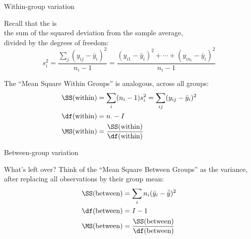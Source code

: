 \begin{frame}{Within-group variation}

  Recall that the  is \\
  the sum of the squared deviation from the sample average,\\
  divided by the degrees of freedom:
  \[
  s_i^2 = \frac{ \sum_j (y_{ij}-\bar y_i)^2 }{ n_i-1 } = \frac{ (y_{i1} - \bar y_i)^2 + \cdots + (y_{in_i} - \bar y_i)^2 }{n_i-1}
  \]

    \vspace{2em}

    The ``\alert{Mean Square Within Groups}'' is analogous, across all groups:
    \begin{align*}
      \SS(\text{within}) &= \sum_{i} (n_i-1) s_i^2 = \sum_{ij} (y_{ij}-\bar y_i)^2 \\
      \df(\text{within}) &= n_\cdot - I \\
      \MS(\text{within}) &= \frac{\SS(\text{within})}{\df(\text{within})}
    \end{align*}


\end{frame}

\begin{frame}{Between-group variation}

  What's left over? 
  Think of the ``\alert{Mean Square Between Groups}'' 
  as the variance, after replacing all observations by their group mean:
  \begin{align*}
    \SS(\text{between}) &= \sum_{i} n_i (\bar y_i - \bar{\bar y})^2 \\
      \df(\text{between}) &= I - 1 \\
      \MS(\text{between}) &= \frac{\SS(\text{between})}{\df(\text{between})}
  \end{align*}

\end{frame}

